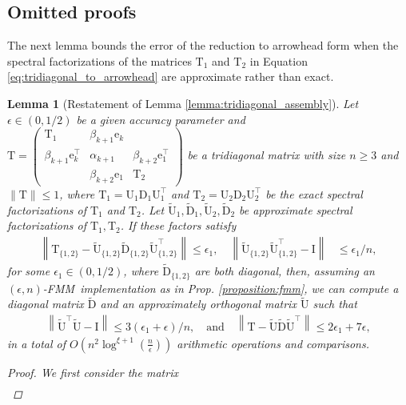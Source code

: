 \documentclass{article}
\newcommand{\lnorm}{\left\|}
\newcommand{\rnorm}{\right\|}
\newcommand{\lpar}{\left(}
\newcommand{\rpar}{\right)}
\newtheorem{lemma}{Lemma}[section]
\newcommand\vece{\boldsymbol{\mathrm{e}}}
\newcommand\matD{\boldsymbol{\mathrm{D}}}
\newcommand\matI{\boldsymbol{\mathrm{I}}}
\newcommand\matT{\boldsymbol{\mathrm{T}}}
\newcommand\matU{\boldsymbol{\mathrm{U}}}
\newcommand\matDtilde{\widetilde{\boldsymbol{\mathrm{D}}}}
\newcommand\matUtilde{\widetilde{\boldsymbol{\mathrm{U}}}}
\newcommand{\cfmm}{\xi}
\newcommand{\fmmalgo}{FMM} \usepackage[utf8]{inputenc}
\begin{document}
\subsection{Omitted proofs}
The next lemma bounds the error of the reduction to arrowhead form when the spectral factorizations of the matrices $\matT_1$ and $\matT_2$ in Equation \eqref{eq:tridiagonal_to_arrowhead} are approximate rather than exact.
\begin{lemma}[Restatement of Lemma \ref{lemma:tridiagonal_assembly}]
\label{lemma:tridiagonal_assembly_appendix}
Let $\epsilon\in(0,1/2)$ be a given accuracy parameter and $\matT = \begin{pmatrix}
    \matT_1 & \beta_{k+1}\vece_k & \\
    \beta_{k+1}\vece_k^\top & \alpha_{k+1} & \beta_{k+2}\vece_1^\top \\
     & \beta_{k+2}\vece_1 & \matT_2
\end{pmatrix}$ be a tridiagonal matrix with size  $n\geq 3$ and $\|\matT\|\leq 1$, where $\matT_1=\matU_1\matD_1\matU_1^\top$ and $\matT_2=\matU_2\matD_2\matU_2^\top$ be the exact spectral factorizations of $\matT_1$ and $\matT_2$. Let $\matUtilde_1,\matDtilde_1,\matUtilde_2,\matDtilde_2$ be approximate spectral factorizations of $\matT_1,\matT_2$. If these factors satisfy
    \begin{align*}
        \lnorm
            \matT_{\{1,2\}} - \matUtilde_{\{1,2\}}\matDtilde_{\{1,2\}}\matUtilde_{\{1,2\}}^\top
        \rnorm 
        \leq \epsilon_1,
        \quad
        \lnorm \matUtilde_{\{1,2\}}\matUtilde_{\{1,2\}}^\top -\matI \rnorm &\leq \epsilon_1/n,
    \end{align*}
    for some $\epsilon_1\in(0,1/2)$, where $\matDtilde_{\{1,2\}}$ are both diagonal, then, assuming an $(\epsilon,n)$-\fmmalgo\   implementation as in Prop. \ref{proposition:fmm}, we can compute a diagonal matrix $\matDtilde$ and an approximately orthogonal matrix $\matUtilde$ such that
    \begin{align*}
        \lnorm\matUtilde^\top\matUtilde-\matI\rnorm\leq 3(\epsilon_1+\epsilon)/n,
        \quad \text{and} \quad
        \lnorm 
            \matT-\matUtilde\matDtilde\matUtilde^\top
        \rnorm \leq 2\epsilon_1+7\epsilon,
    \end{align*}
    in a total of $O\lpar n^2\log^{\cfmm+1}(\tfrac{n}{\epsilon})\rpar$ arithmetic operations and comparisons.
    \begin{proof}
        We first consider the matrix
        \begin{align*}

\end{align*}
\end{proof}
\end{lemma}
\end{document}
